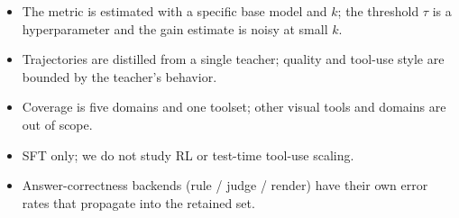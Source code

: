 \begin{itemize}
  \item The \toolgain metric is estimated with a specific base model and $k$;
  the threshold $\tau$ is a hyperparameter and the gain estimate is noisy at
  small $k$.
  \item Trajectories are distilled from a single teacher; quality and tool-use
  style are bounded by the teacher's behavior.
  \item Coverage is five domains and one toolset; other visual tools and
  domains are out of scope.
  \item SFT only; we do not study RL or test-time tool-use scaling.
  \item Answer-correctness backends (rule / judge / render) have their own
  error rates that propagate into the retained set.
\end{itemize}
